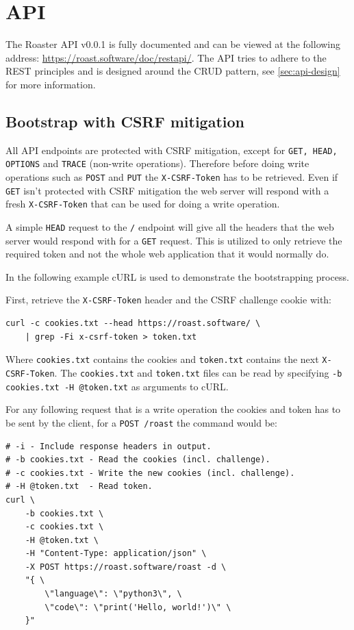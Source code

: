 \documentclass[12pt,a4paper]{report}
\begin{document}

\chapter{API}
The Roaster API v0.0.1 is fully documented and can be viewed at the following address: \url{https://roast.software/doc/restapi/}. The API tries to adhere to the REST principles and is designed around the CRUD pattern, see \autoref{sec:api-design} for more information.

\section{Bootstrap with CSRF mitigation}
\label{sec:api-bootstrap}
All API endpoints are protected with CSRF mitigation, except for \texttt{GET, HEAD, OPTIONS} and \texttt{TRACE} (non-write operations). Therefore before doing write operations such as \texttt{POST} and \texttt{PUT} the \texttt{X-CSRF-Token} has to be retrieved. Even if \texttt{GET} isn't protected with CSRF mitigation the web server will respond with a fresh \texttt{X-CSRF-Token} that can be used for doing a write operation.

A simple \texttt{HEAD} request to the \texttt{/} endpoint will give all the headers that the web server would respond with for a \texttt{GET} request. This is utilized to only retrieve the required token and not the whole web application that it would normally do.

In the following example cURL is used to demonstrate the bootstrapping process.

First, retrieve the \texttt{X-CSRF-Token} header and the CSRF challenge cookie with:
\begin{verbatim}
curl -c cookies.txt --head https://roast.software/ \
    | grep -Fi x-csrf-token > token.txt
\end{verbatim}
Where \texttt{cookies.txt} contains the cookies and \texttt{token.txt} contains the next \texttt{X-CSRF-Token}.
The \texttt{cookies.txt} and \texttt{token.txt} files can be read by specifying \texttt{-b cookies.txt -H @token.txt} as arguments to cURL.

\newpage
For any following request that is a write operation the cookies and token has to be sent by the client, for a \texttt{POST /roast} the command would be:
\begin{verbatim}
# -i - Include response headers in output.
# -b cookies.txt - Read the cookies (incl. challenge).
# -c cookies.txt - Write the new cookies (incl. challenge).
# -H @token.txt  - Read token.
curl \
    -b cookies.txt \
    -c cookies.txt \
    -H @token.txt \
    -H "Content-Type: application/json" \
    -X POST https://roast.software/roast -d \
    "{ \
        \"language\": \"python3\", \
        \"code\": \"print('Hello, world!')\" \
    }"
\end{verbatim}
\end{document}
